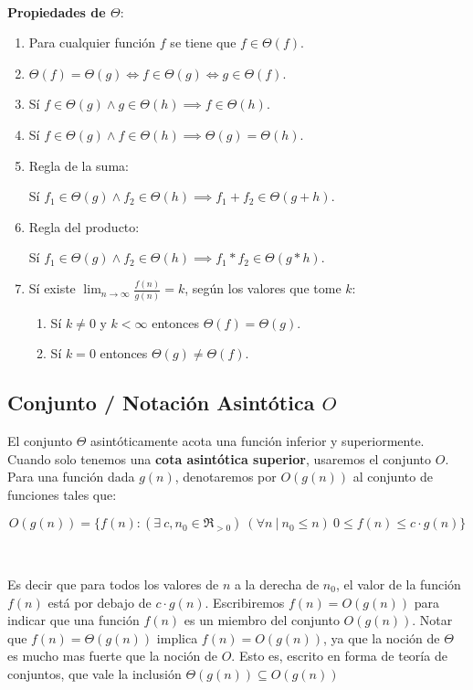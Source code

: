 ~

\textbf{Propiedades de $\Theta$}:
\begin{enumerate}
 \item Para cualquier funci\'on $f$ se tiene que $f \in \Theta(f)$.
 \item $\Theta(f) = \Theta(g) \iff f \in \Theta(g) \iff g \in \Theta(f)$.
 \item S\'i $f \in \Theta(g) \land g \in \Theta(h) \implies f \in \Theta(h)$.
 \item S\'i $f \in \Theta(g) \land f \in \Theta(h) \implies \Theta(g) = \Theta(h)$.
 \item Regla de la suma:

	S\'i $f_1 \in \Theta(g) \land f_2 \in \Theta(h) \implies f_1 + f_2 \in \Theta(g+h)$.
 \item Regla del producto:

	S\'i $f_1 \in \Theta(g) \land f_2 \in \Theta(h) \implies f_1 * f_2 \in \Theta(g*h)$.
 \item S\'i existe $\lim_{n \to \infty} \frac{f(n)}{g(n)} = k$, seg\'un los valores que tome $k$:
	\begin{enumerate}
	  \item S\'i $k \neq 0$ y $k < \infty$ entonces $\Theta(f) = \Theta(g)$.
	  \item S\'i $k = 0$ entonces $\Theta(g) \neq \Theta(f)$.
	\end{enumerate}
\end{enumerate}

\subsection{Conjunto / Notaci\'on Asint\'otica $O$}

El conjunto $\Theta$ asint\'oticamente acota una funci\'on inferior y superiormente. Cuando solo tenemos una \textbf{cota asint\'otica superior}, usaremos el conjunto $O$. Para una funci\'on dada $g(n)$, denotaremos por $O(g(n))$ al conjunto de funciones tales que:

\begin{equation*}
 O(g(n)) = \{ f(n) : (\exists\ c, n_0 \in \Re_{>0}) \ (\forall n\ |\ n_0 \leq n)\ 0 \leq f(n) \leq c \cdot g(n) \}
\end{equation*}

~

Es decir que para todos los valores de $n$ a la derecha de $n_0$, el valor de la funci\'on $f(n)$ est\'a por debajo de $c \cdot g(n)$. Escribiremos $f(n) = O(g(n))$ para indicar que una funci\'on $f(n)$ es un miembro del conjunto $O(g(n))$. Notar que $f(n) = \Theta(g(n))$ implica $f(n) = O(g(n))$, ya que la noci\'on de $\Theta$ es mucho mas fuerte que la noci\'on de $O$. Esto es, escrito en forma de teor\'ia de conjuntos, que vale la inclusi\'on $\Theta(g(n)) \subseteq O(g(n))$

